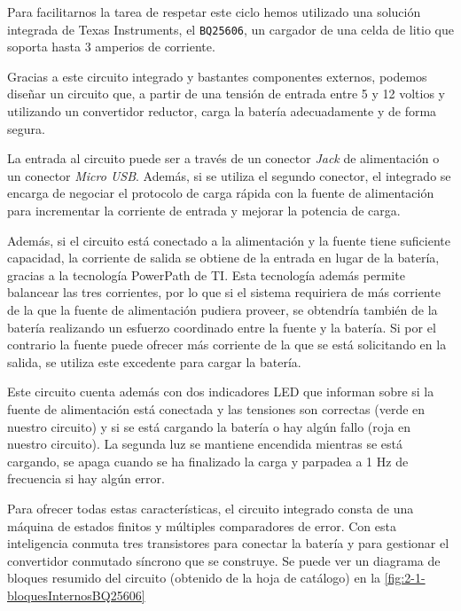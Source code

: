Para facilitarnos la tarea de respetar este ciclo hemos utilizado una solución integrada de Texas Instruments, el \texttt{BQ25606}, un cargador de una celda de litio que soporta hasta 3 amperios de corriente. \cite{BQ25606DataSheet}

Gracias a este circuito integrado y bastantes componentes externos, podemos diseñar un circuito que, a partir de una tensión de entrada entre 5 y 12 voltios y utilizando un convertidor reductor, carga la batería adecuadamente y de forma segura. 

La entrada al circuito puede ser a través de un conector \textit{Jack} de alimentación o un conector \textit{Micro USB}. Además, si se utiliza el segundo conector, el integrado se encarga de negociar el protocolo de carga rápida con la fuente de alimentación para incrementar la corriente de entrada y mejorar la potencia de carga. 

Además, si el circuito está conectado a la alimentación y la fuente tiene suficiente capacidad, la corriente de salida se obtiene de la entrada en lugar de la batería, gracias a la tecnología PowerPath de TI. Esta tecnología además permite balancear las tres corrientes, por lo que si el sistema requiriera de más corriente de la que la fuente de alimentación pudiera proveer, se obtendría también de la batería realizando un esfuerzo coordinado entre la fuente y la batería. Si por el contrario la fuente puede ofrecer más corriente de la que se está solicitando en la salida, se utiliza este excedente para cargar la batería.

Este circuito cuenta además con dos indicadores LED que informan sobre si la fuente de alimentación está conectada y las tensiones son correctas (verde en nuestro circuito) y si se está cargando la batería o hay algún fallo (roja en nuestro circuito). La segunda luz se mantiene encendida mientras se está cargando, se apaga cuando se ha finalizado la carga y parpadea a 1 Hz de frecuencia si hay algún error.

Para ofrecer todas estas características, el circuito integrado consta de una máquina de estados finitos y múltiples comparadores de error. Con esta inteligencia conmuta tres transistores para conectar la batería y para gestionar el convertidor conmutado síncrono que se construye. Se puede ver un diagrama de bloques resumido del circuito (obtenido de la hoja de catálogo) en la \autoref{fig:2-1-bloquesInternosBQ25606}

